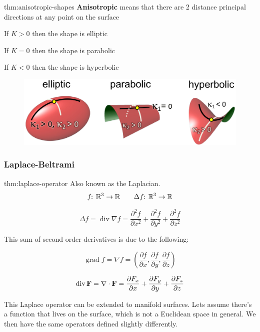\documentclass{article}
\begin{document}
\begin{defin}[Anisotropic]{thm:anisotropic-shapes}
    \textbf{Anisotropic} means that there are 2 distance principal directions at any point on the surface

    \vspace{5px}

    If \(K > 0\) then the shape is elliptic

    If \(K = 0\) then the shape is parabolic

    If \(K < 0\) then the shape is hyperbolic
\end{defin}

\begin{figure}[!ht]
    \centering
    \includegraphics[width=0.5\linewidth]{images/Anistropic_Shapes.png}
\end{figure}

\newpage

\subsubsection{Laplace-Beltrami}

\begin{defin}{thm:laplace-operator}
    Also known as the Laplacian.
    \[
        f\!\!: \, \mathbb{R}^{3} \to \mathbb{R} \qquad \Delta f\!\!: \, \mathbb{R}^{3} \to \mathbb{R}
    \]

    \[
        \Delta f = \operatorname*{div} \nabla f = \frac{\partial^2 f}{\partial x^2} + \frac{\partial^2 f}{\partial y^2} + \frac{\partial^2 f}{\partial z^2}
    \]
\end{defin}

This sum of second order derivatives is due to the following:

\[
    \operatorname{grad} f = \nabla f = \left( \frac{\partial f}{\partial x}, \frac{\partial f}{\partial y}, \frac{\partial f}{\partial z} \right)
\]

\[
    \operatorname*{div} \mathbf{F} = \nabla \cdot \mathbf{F} = \frac{\partial F_{x}}{\partial x} + \frac{\partial F_{y}}{\partial y} + \frac{\partial F_{z}}{\partial z}
\]

This Laplace operator can be extended to manifold surfaces. Lets assume there's a function that lives on the
surface, which is not a Euclidean space in general. We then have the same operators defined slightly differently.
\end{document}
